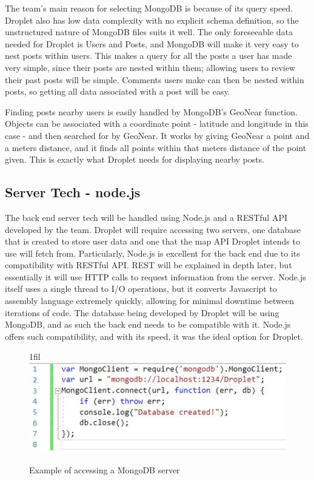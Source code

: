 \documentclass[draftclsnofoot, onecolumn, letterpaper,10pt,compsoc]{IEEEtran}
\makeatletter
\newcommand*{\centerfloat}{%
  \parindent \z@
  \leftskip \z@ \@plus 1fil \@minus \textwidth
  \rightskip\leftskip
  \parfillskip \z@skip}
\newcommand*{\centerfloat}{%
  \parindent \z@
  \leftskip \z@ \@plus 1fil \@minus \textwidth
  \rightskip\leftskip
  \parfillskip \z@skip}
\makeatother
\begin{document}
The team's main reason for selecting MongoDB is because of its query speed. Droplet also has low data complexity with no explicit schema definition, so the unstructured nature of MongoDB files suits it well. The only foreseeable data needed for Droplet is Users and Posts, and MongoDB will make it very easy to nest posts within users. This makes a query for all the posts a user has made very simple, since their posts are nested within them; allowing users to review their past posts will be simple. Comments users make can then be nested within posts, so getting all data associated with a post will be easy. 

Finding posts nearby users is easily handled by MongoDB's GeoNear function. Objects can be associated with a coordinate point - latitude and longitude in this case - and then searched for by GeoNear. It works by giving GeoNear a point and a meters distance, and it finds all points within that meters distance of the point given. This is exactly what Droplet needs for displaying nearby posts.

\subsection{Server Tech - node.js}
The back end server tech will be handled using Node.js and a RESTful API developed by the team.  Droplet will require accessing two servers, one database that is created to store user data and one that the map API Droplet intends to use will fetch from.  Particularly, Node.js is excellent for the back end due to its compatibility with RESTful API.  REST will be explained in depth later, but essentially it will use HTTP calls to request information from the server.  Node.js itself uses a single thread to I/O operations, but it converts Javascript to assembly language extremely quickly, allowing for minimal downtime between iterations of code.  The database being developed by Droplet will be using MongoDB, and as such the back end needs to be compatible with it.  Node.js offers such compatibility, and with its speed, it was the ideal option for Droplet.
\begin{figure}[H]
    \centerfloat
    \includegraphics[scale=.8]{images/nodejs.JPG}
    \caption{Example of accessing a MongoDB server}
    \label{fig:my_label}
\end{figure}
\end{document}
